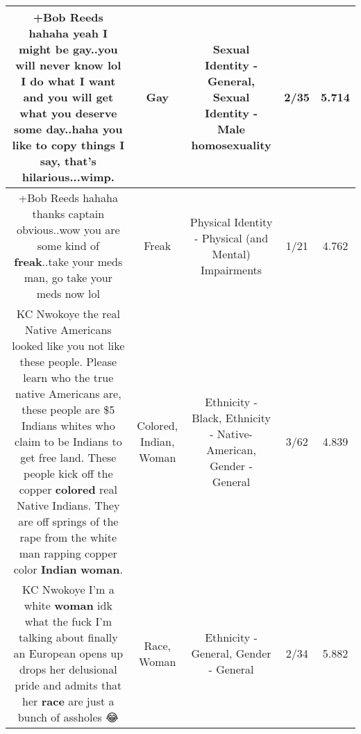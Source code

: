 \documentclass[11pt]{article}
\newlength\mylength
\begin{document}
\begin{center}
\begin{longtable}{|C{.65\mylength}|C{.30\mylength}|C{.12\mylength}|C{.12\mylength}|C{.12\mylength}|}
  \small +Bob Reeds hahaha yeah I might be \textbf{g\textbf{ay}}..you will never know lol I do what I want and you will get what you deserve some day..haha you like to copy things I say, that's hilarious...wimp.\normalsize   & Gay & Sexual Identity - General, Sexual Identity - Male homosexuality & 2/35 & 5.714 \\  \hline
  \small +Bob Reeds hahaha thanks captain obvious..wow you are some kind of \textbf{freak}..take your meds man, go take your meds now lol\normalsize   & Freak & Physical Identity - Physical (and Mental) Impairments & 1/21 & 4.762 \\  \hline
  \small KC Nwokoye the real Native Americans looked like you not like these people.  Please learn who the true native Americans are,  these people are \$5 Indians whites who claim to be Indians to get free land.  These people kick off the copper \textbf{colored} real Native Indians.  They are off springs of the rape from the white man rapping copper color \textbf{Indian} \textbf{woman}.\normalsize   & Colored, Indian, Woman & Ethnicity - Black, Ethnicity - Native-American, Gender - General & 3/62 & 4.839 \\  \hline
  \small KC Nwokoye I'm a white \textbf{woman} idk what the fuck I'm talking about finally an European opens up drops her delusional pride and admits that her \textbf{race} are just a bunch of assholes 😂\normalsize   & Race, Woman & Ethnicity - General, Gender - General & 2/34 & 5.882 \\  \hline

\end{longtable}
\end{center}
\end{document}
